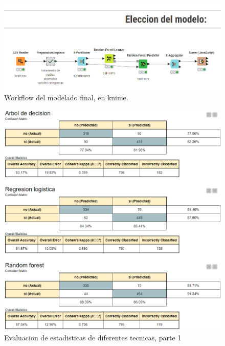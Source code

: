 \documentclass[12pt, letterpaper]{article}
\begin{document}
\begin{figure}
    \centering
    \includegraphics[scale=0.59]{entrega4.png}
    \caption{Workflow del modelado final, en knime.}
    \label{fig:Workflow4}
\end{figure}

\begin{figure}
    \centering
    \includegraphics[scale=0.58]{tecnicas1.png}
    \caption{Evaluacion de estadisticas de diferentes tecnicas, parte 1}
    \label{fig:tecnicas1}
\end{figure}
\end{document}
